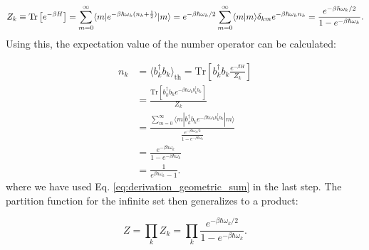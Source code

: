 \begin{equation} \label{eq:partition_function}
	Z_k \equiv \mathrm{Tr}\left[e^{-\beta H}\right]
	= \sum_{m=0}^{\infty} \langle m | e^{-\beta \hbar \omega_k (n_k + \frac{1}{2})} | m \rangle
	= e^{-\beta \hbar \omega_k / 2} \sum_{m=0}^{\infty} \langle m | m \rangle \delta_{km} e^{-\beta \hbar \omega_k n_k} \\
	= \frac{e^{-\beta \hbar \omega_k / 2}}{1 - e^{-\beta \hbar \omega_k}}. %
\end{equation}
Using this, the expectation value of the number operator can be calculated:

\begin{align} \label{eq:expectation_number_operator}
	n_k & = \langle b_k^{\dagger} b_k \rangle_{\text{th}} = \mathrm{Tr} \left[ b_k^{\dagger} b_k \frac{e^{-\beta H}}{Z_k} \right]                                                             \\
	    & = \frac{\mathrm{Tr} \left[ b_k^{\dagger} b_k e^{-\beta \hbar \omega_k b_k^{\dagger} b_k} \right]}{Z_k}                                                                              \\
	    & = \frac{\sum_{m=0}^{\infty} \langle m|b_k^{\dagger} b_k e^{-\beta \hbar \omega_k b_k^{\dagger} b_k}|m \rangle}{\frac{e^{-\beta \hbar \omega_k / 2}}{1 - e^{-\beta \hbar \omega_k}}} \\
	    & = \frac{e^{-\beta \hbar \omega_k}}{1 - e^{-\beta \hbar \omega_k}}                                                                                                                   \\
	    & = \frac{1}{e^{\beta \hbar \omega_k} - 1}.
\end{align}
where we have used Eq. \eqref{eq:derivation_geometric_sum} in the last step.
The partition function for the infinite set then generalizes to a product:

\begin{equation} \label{eq:generalized_partition_function}
	Z = \prod_k Z_k = \prod_k \frac{e^{-\beta \hbar \omega_k / 2}}{1 - e^{-\beta \hbar \omega_k}}.
\end{equation}

